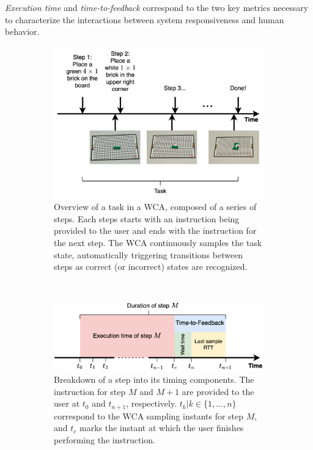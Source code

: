 \emph{Execution time} and \emph{time-to-feedback} correspond to the two key metrics necessary to characterize the interactions between system responsiveness and human behavior.

\begin{figure}
    \centering
    \begin{subfigure}{\columnwidth}
        \centering
        \includegraphics[width=\columnwidth]{figs/task.png}
        \caption{%
            Overview of a task in a \ac{WCA}, composed of a series of steps.
            Each steps starts with an instruction being provided to the user and ends with the instruction for the next step.
            The \ac{WCA} continuously samples the task state, automatically triggering transitions between steps as correct (or incorrect) states are recognized.
        }\label{fig:task}
    \end{subfigure}\\
    \begin{subfigure}{\columnwidth}
        \centering
        \includegraphics[width=\columnwidth]{figs/step_time.png}
        \caption{%
            Breakdown of a step into its timing components.
            The instruction for step \( M \) and \( M + 1 \) are provided to the user at \( t_0 \) and \( t_{n+1} \), respectively.
            \( t_k | k \in \{1, \ldots, n \} \) correspond to the \ac{WCA} sampling instants for step \( M \), and \( t_c \) marks the instant at which the user finishes performing the instruction.
        }\label{fig:step}
    \end{subfigure}
    \caption{}
\end{figure}


